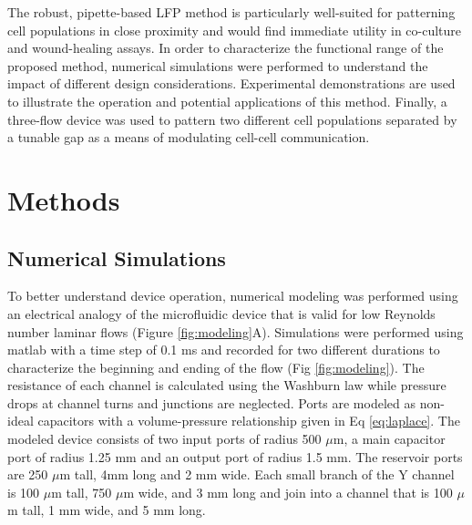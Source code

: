 
The robust, pipette-based LFP method is particularly well-suited for patterning cell populations in close proximity and would find immediate utility in co-culture and wound-healing assays. In order to characterize the functional range of the proposed method, numerical simulations were performed to understand the impact of different design considerations. Experimental demonstrations are used to illustrate the operation and potential applications of this method. Finally, a three-flow device was used to pattern two different cell populations separated by a tunable gap as a means of modulating cell-cell communication. %

\section{Methods}

\subsection{Numerical Simulations}

To better understand device operation, numerical modeling was performed using an electrical analogy of the microfluidic device that is valid for low Reynolds number laminar flows (Figure \ref{fig:modeling}A). Simulations were performed using matlab with a time step of 0.1 ms and recorded for two different durations to characterize the beginning and ending of the flow (Fig \ref{fig:modeling}). The resistance of each channel is calculated using the Washburn law while pressure drops at channel turns and junctions are neglected. Ports are modeled as non-ideal capacitors with a volume-pressure relationship given in Eq \ref{eq:laplace}. The modeled device consists of two input ports of radius 500 $\mu$m, a main capacitor port of radius 1.25 mm and an output port of radius 1.5 mm. The reservoir ports are 250 $\mu$m tall, 4mm long and 2 mm wide. Each small branch of the Y channel is 100 $\mu$m tall, 750 $\mu$m wide, and 3 mm long and join into a channel that is 100 $\mu$m tall, 1 mm wide, and 5 mm long. 

